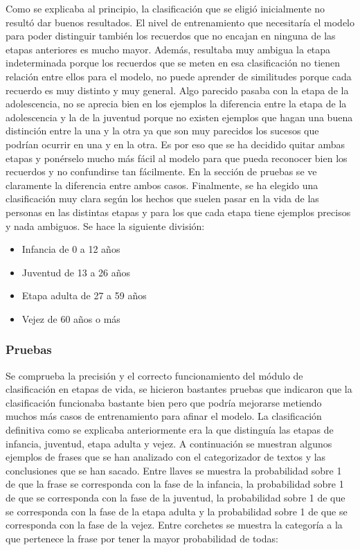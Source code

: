 Como se explicaba al principio, la clasificación que se eligió inicialmente no resultó dar buenos resultados. El nivel de entrenamiento que necesitaría el modelo para poder distinguir también los recuerdos que no encajan en ninguna de las etapas anteriores es mucho mayor. Además, resultaba muy ambigua la etapa indeterminada porque los recuerdos que se meten en esa clasificación no tienen relación entre ellos para el modelo, no puede aprender de similitudes porque cada recuerdo es muy distinto y muy general. Algo parecido pasaba con la etapa de la adolescencia, no se aprecia bien en los ejemplos la diferencia entre la etapa de la adolescencia y la de la juventud porque no existen ejemplos que hagan una buena distinción entre la una y la otra ya que son muy parecidos los sucesos que podrían ocurrir en una y en la otra. Es por eso que se ha decidido quitar ambas etapas y ponérselo mucho más fácil al modelo para que pueda reconocer bien los recuerdos y no confundirse tan fácilmente. En la sección de pruebas se ve claramente la diferencia entre ambos casos. Finalmente, se ha elegido una  clasificación muy clara según los hechos que suelen pasar en la vida de las personas en las distintas etapas y para los que cada etapa tiene ejemplos precisos y nada ambiguos. Se hace la siguiente división:

\begin{itemize}
	\item Infancia de 0 a 12 años
	\item Juventud de 13 a 26 años
	\item Etapa adulta de 27 a 59 años
	\item Vejez de 60 años o más
\end{itemize}


\subsubsection{Pruebas}

Se comprueba la precisión y el correcto funcionamiento del módulo de clasificación en etapas de vida, se hicieron bastantes pruebas que indicaron que la clasificación funcionaba bastante bien pero que podría mejorarse metiendo muchos más casos de entrenamiento para afinar el modelo. La clasificación definitiva como se explicaba anteriormente era la que distinguía las etapas de infancia, juventud, etapa adulta y vejez. A continuación se muestran algunos ejemplos de frases que se han analizado con el categorizador de textos y las conclusiones que se han sacado. Entre llaves se muestra la probabilidad sobre 1 de que la frase se corresponda con la fase de la infancia, la probabilidad sobre 1 de que se corresponda con la fase de la juventud, la probabilidad sobre 1 de que se corresponda con la fase de la etapa adulta y la probabilidad sobre 1 de que se corresponda con la fase de la vejez. Entre corchetes se muestra la categoría a la que pertenece la frase por tener la mayor probabilidad de todas:

